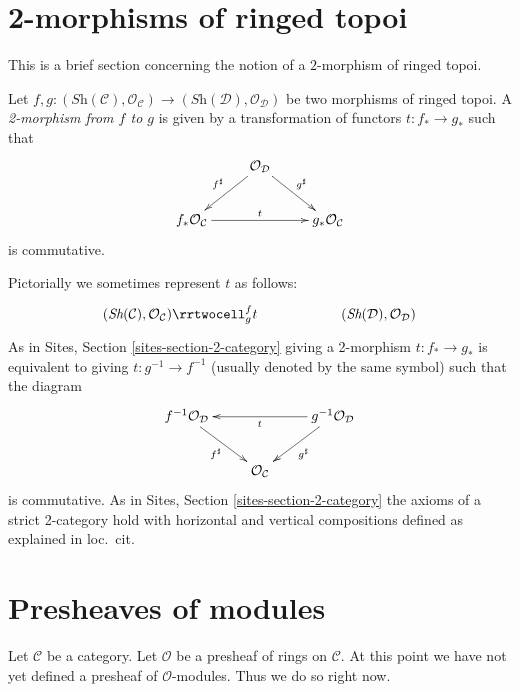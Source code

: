 \section{2-morphisms of ringed topoi}
\label{section-2-category}

\noindent
This is a brief section concerning the notion of a $2$-morphism
of ringed topoi.

\begin{definition}
\label{definition-2-morphism-ringed-topoi}
Let
$f, g :
(\textit{Sh}(\mathcal{C}), \mathcal{O}_{\mathcal{C}})
\to
(\textit{Sh}(\mathcal{D}), \mathcal{O}_{\mathcal{D}})$
be two morphisms of ringed topoi. A {\it 2-morphism from $f$ to $g$}
is given by a transformation of functors $t : f_* \to g_*$ such that
$$
\xymatrix{
& \mathcal{O}_{\mathcal{D}}
\ar[ld]_{f^\sharp}
\ar[rd]^{g^\sharp} \\
f_*\mathcal{O}_{\mathcal{C}} \ar[rr]^t & &
g_*\mathcal{O}_{\mathcal{C}}
}
$$
is commutative.
\end{definition}

\noindent
Pictorially we sometimes represent $t$ as follows:
$$
\xymatrix{
(\textit{Sh}(\mathcal{C}), \mathcal{O}_{\mathcal{C}})
\rrtwocell^f_{g}{t}
&
&
(\textit{Sh}(\mathcal{D}), \mathcal{O}_{\mathcal{D}})
}
$$
As in
Sites, Section \ref{sites-section-2-category}
giving a 2-morphism $t : f_* \to g_*$ is equivalent to giving
$t : g^{-1} \to f^{-1}$ (usually denoted by the same symbol)
such that the diagram
$$
\xymatrix{
f^{-1}\mathcal{O}_{\mathcal{D}}
\ar[rd]_{f^\sharp}  & &
g^{-1}\mathcal{O}_{\mathcal{D}} \ar[ll]^t \ar[ld]^{g^\sharp} \\
& \mathcal{O}_{\mathcal{C}}
}
$$
is commutative. As in
Sites, Section \ref{sites-section-2-category}
the axioms of a strict 2-category hold with horizontal and
vertical compositions defined as explained in loc.\ cit.










\section{Presheaves of modules}
\label{section-presheaves-modules}

\noindent
Let $\mathcal{C}$ be a category.
Let $\mathcal{O}$ be a presheaf of rings on $\mathcal{C}$.
At this point we have not yet defined a presheaf of $\mathcal{O}$-modules.
Thus we do so right now.

